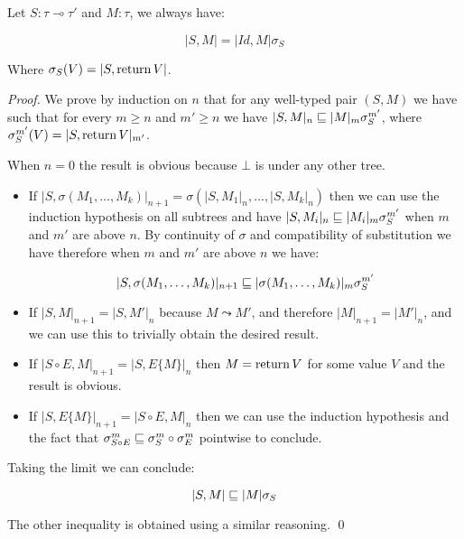 \begin{alemma}
    \label{lem:stackcom}
    Let $S : \tau \multimap \tau'$ and $M : \tau$, we always have:

    \begin{equation*}
        |S, M| = |Id,M| \sigma_S
    \end{equation*}

    Where $\sigma_S (V) = |S, \operatorname{return} V|$.
\end{alemma}

\begin{proof}
    We prove by induction on $n$ that for any well-typed pair $(S,M)$ we have 
    such that for every $m \geq n$ and $m' \geq n$ 
    we have $|S,M|_n \sqsubseteq |M|_m \sigma^{m'}_S$, where 
    $\sigma^{m'}_S (V) = |S, \operatorname{return} V|_{m'}$.

    When $n=0$ the result is obvious because $\bot$ is under any other tree.

    \begin{itemize}
        \item If $|S,\sigma(M_1, \dots, M_k)|_{n+1} = \sigma (|S,M_1|_n, \dots,
            |S, M_k|_n)$ then we can use the induction hypothesis on all 
            subtrees and have $|S, M_i|_n \sqsubseteq |M_i|_m \sigma^{m'}_S$ when 
            $m$ and $m'$ are above $n$. By continuity of $\sigma$ and 
            compatibility of substitution we have therefore when $m$ and $m'$
            are above $n$ we have:

            \begin{equation*}
                |S, \sigma (M_1, \dots, M_k)|_{n+1} \sqsubseteq |\sigma(M_1, \dots,
                M_k)|_m \sigma^{m'}_S
            \end{equation*}

        \item If $|S, M|_{n+1} = |S, M'|_n$ because $M \leadsto M'$, and 
            therefore $|M|_{n+1} = |M'|_n$, and we can use this to trivially
            obtain the desired result.

        \item If $|S \circ E, M|_{n+1} = |S, E \{M\}|_n$ then 
            $M = \operatorname{return} V$ for some value $V$ and the result is obvious.

        \item If $|S, E\{M\}|_{n+1} = |S \circ E, M|_n$ then 
            we can use the induction hypothesis and the fact that 
            $\sigma^m_{S \circ E} \sqsubseteq \sigma^m_S \circ \sigma^m_E$ pointwise
            to conclude.
    \end{itemize}
    
    Taking the limit we can conclude:

    \begin{equation*}
        |S,M| \sqsubseteq |M| \sigma_S
    \end{equation*}
    
    The other inequality is obtained using a similar reasoning. 
\qed\end{proof}


